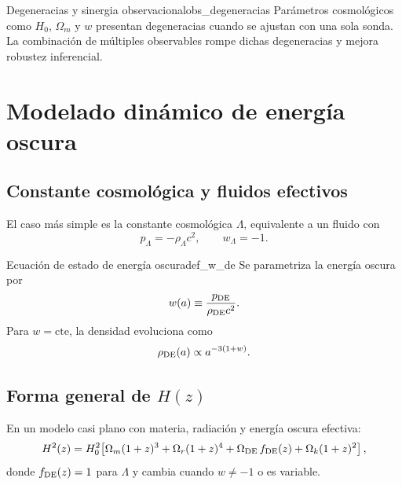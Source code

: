\begin{observacion}{Degeneracias y sinergia observacional}{obs_degeneracias}
Parámetros cosmológicos como $H_0$, $\Omega_m$ y $w$ presentan degeneracias cuando se ajustan con una sola sonda. La combinación de múltiples observables rompe dichas degeneracias y mejora robustez inferencial.
\end{observacion}

\section{Modelado dinámico de energía oscura}
\label{sec:modelado_de}

\subsection{Constante cosmológica y fluidos efectivos}

El caso más simple es la constante cosmológica $\Lambda$, equivalente a un fluido con
\begin{equation}
  p_\Lambda = -\rho_\Lambda c^2,
  \qquad
  w_\Lambda=-1.
\end{equation}

\begin{definicion}{Ecuación de estado de energía oscura}{def_w_de}
Se parametriza la energía oscura por
\begin{equation}
  w(a)\equiv \frac{p_{\rm DE}}{\rho_{\rm DE}c^2}.
\end{equation}
Para $w=\text{cte}$, la densidad evoluciona como
\begin{equation}
  \rho_{\rm DE}(a)\propto a^{-3(1+w)}.
\end{equation}
\end{definicion}

\subsection{Forma general de $H(z)$}

En un modelo casi plano con materia, radiación y energía oscura efectiva:
\begin{equation}
  H^2(z)=H_0^2\!\left[\Omega_m(1+z)^3+\Omega_r(1+z)^4+\Omega_{\rm DE}\,f_{\rm DE}(z)+\Omega_k(1+z)^2\right],
\end{equation}
donde $f_{\rm DE}(z)=1$ para $\Lambda$ y cambia cuando $w\neq -1$ o es variable.


